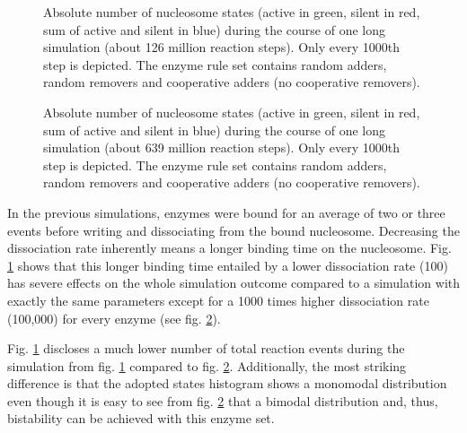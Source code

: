             \begin{figure}[htpb!]
                \centering
                \caption{Absolute number of nucleosome states (active in green, silent in red, sum of active and silent in blue) during the course of one long simulation (about 126 million reaction steps). Only every 1000th step is depicted. The enzyme rule set contains random adders, random removers and cooperative adders (no cooperative removers).}
                \label{img:dissoc_runPlot1}
            \end{figure}

            \begin{figure}[htpb!]
                \centering
                \caption{Absolute number of nucleosome states (active in green, silent in red, sum of active and silent in blue) during the course of one long simulation (about 639 million reaction steps). Only every 1000th step is depicted. The enzyme rule set contains random adders, random removers and cooperative adders (no cooperative removers).}
                \label{img:dissoc_runPlot2}
            \end{figure}

            In the previous simulations, enzymes were bound for an average of two or three events before writing and dissociating from the bound nucleosome. Decreasing the dissociation rate inherently means a longer binding time on the nucleosome. Fig. \ref{img:dissoc_runPlot1} shows that this longer binding time entailed by a lower dissociation rate (100) has severe effects on the whole simulation outcome compared to a simulation with exactly the same parameters except for a 1000 times higher dissociation rate (100,000) for every enzyme (see fig. \ref{img:dissoc_runPlot2}).

            Fig. \ref{img:dissoc_runPlot1} discloses a much lower number of total reaction events during the simulation from fig. \ref{img:dissoc_runPlot1} compared to fig. \ref{img:dissoc_runPlot2}. Additionally, the most striking difference is that the adopted states histogram shows a monomodal distribution even though it is easy to see from fig. \ref{img:dissoc_runPlot2} that a bimodal distribution and, thus, bistability can be achieved with this enzyme set.


